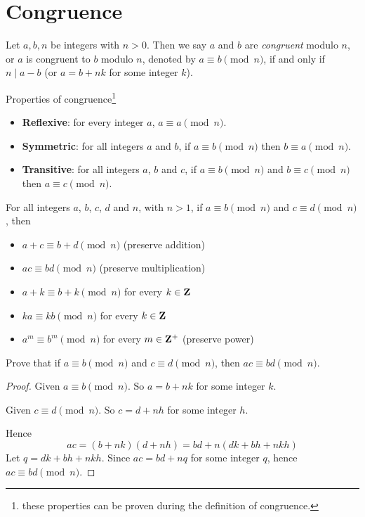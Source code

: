 \section{Congruence}
\begin{definition}[Congruence]
Let $a,b,n$ be integers with $n>0$. Then we say $a$ and $b$ are \emph{congruent} modulo $n$, or $a$ is congruent to $b$ modulo $n$, denoted by $a\equiv b\pmod n$, if and only if $n\mid a-b$ (or $a=b+nk$ for some integer $k$).
\end{definition}

Properties of congruence\footnote{these properties can be proven during the definition of congruence.}
\begin{itemize}
\item \textbf{Reflexive}: for every integer $a$, $a \equiv a \pmod n$.
\item \textbf{Symmetric}: for all integers $a$ and $b$, if $a \equiv b \pmod n$ then $b \equiv a \pmod n$.
\item \textbf{Transitive}: for all integers $a$, $b$ and $c$, if $a \equiv b \pmod n$ and $b \equiv c \pmod n$ then $a \equiv c \pmod n$.
\end{itemize}

For all integers $a$, $b$, $c$, $d$ and $n$, with $n>1$, if $a \equiv b \pmod n$ and $c \equiv d \pmod n$, then
\begin{itemize}
\item $a+c \equiv b+d \pmod n$ (preserve addition)
\item $ac \equiv bd \pmod n$ (preserve multiplication)
\item $a+k \equiv b+k \pmod n$ for every $k\in\mathbf Z$
\item $ka \equiv kb \pmod n$ for every $k\in\mathbf Z$
\item $a^m \equiv b^m \pmod n$ for every $m\in\mathbf Z^+$ (preserve power)
\end{itemize}

\begin{exercise}
Prove that if $a\equiv b\pmod n$ and $c\equiv d\pmod n$, then $ac\equiv bd\pmod n$.
\end{exercise}
\begin{proof}
Given $a\equiv b\pmod n$. So $a=b+nk$ for some integer $k$.

Given $c\equiv d\pmod n$. So $c=d+nh$ for some integer $h$.

Hence 
\[ac=(b+nk)(d+nh)=bd+n(dk+bh+nkh)\]
Let $q=dk+bh+nkh$. Since $ac=bd+nq$ for some integer $q$, hence $ac\equiv bd\pmod n$.
\end{proof}

